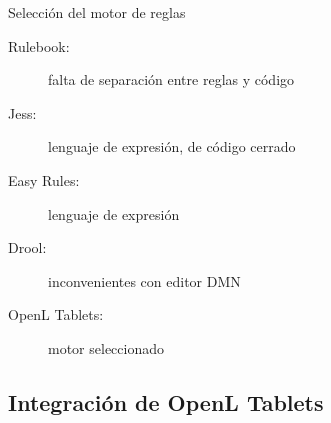 \documentclass[10pt]{beamer}
\begin{document}
\begin{frame}{Selección del motor de reglas}
    \begin{description}
        \item [Rulebook:] falta de separación entre reglas y código
        \item [Jess:] lenguaje de expresión, de código cerrado
        \item [Easy Rules:] lenguaje de expresión
        \item [Drool:] inconvenientes con editor DMN
        \item [OpenL Tablets:] motor seleccionado
    \end{description}
\end{frame}

\subsection{Integración de OpenL Tablets}
\end{document}
